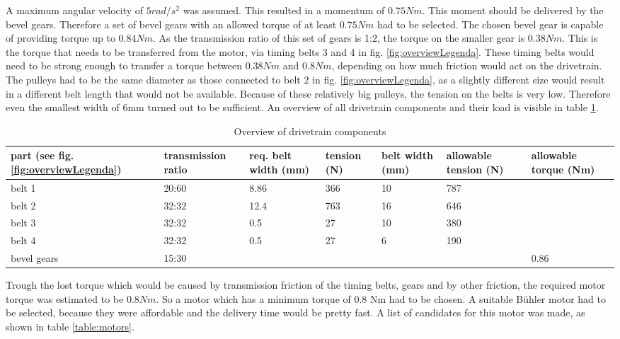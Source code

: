 \documentclass[technical_document.tex]{subfiles}
\begin{document}
A maximum angular velocity of $5 rad/s^2$ was assumed. This resulted in a momentum of $0.75Nm$. This moment should be delivered by the bevel gears. Therefore a set of bevel gears with an allowed torque of at least $0.75Nm$ had to be selected. The chosen bevel gear is capable of providing torque up to $0.84Nm$. As the transmission ratio of this set of gears is 1:2, the torque on the smaller gear is $0.38Nm$. This is the torque that needs to be transferred from the motor, via timing belts 3 and 4 in fig. \ref{fig:overviewLegenda}. These timing belts would need to be strong enough to transfer a torque between $0.38Nm$ and $0.8Nm$, depending on how much friction would act on the drivetrain. The pulleys had to be the same diameter as those connected to belt 2 in fig. \ref{fig:overviewLegenda}, as a slightly different size would result in a different belt length that would not be available. Because of these relatively big pulleys, the tension on the belts is very low. Therefore even the smallest width of 6mm turned out to be sufficient. An overview of all drivetrain components and their load is visible in table \ref{table:belts}.


\begin{table}[h]
\begin{tabular}{| p{1.7cm} | p{1.8cm} | p{1.7cm} | p{1.8cm} | p{1.7cm} | p{1.7cm} | p{1.7cm} |}
\hline
part (see fig. \ref{fig:overviewLegenda})	&	transmission ratio	&	req. belt width (mm)	&	tension (N)	&	belt width (mm)	&	allowable tension (N)	&	allowable torque (Nm)	\\
\hline
belt 1		&	20:60	&	8.86	&	366	&	10	&	787	&			\\
belt 2		&	32:32	&	12.4	&	763	&	16	&	646	&			\\
belt 3		&	32:32	&	0.5		&	27	&	10	&	380	&			\\
belt 4		&	32:32	&	0.5		&	27	&	6	&	190	&			\\
bevel gears	&	15:30	&			&		&		&		&	0.86	\\
\hline
\end{tabular}
\caption{Overview of drivetrain components}
\label{table:belts}
\end{table}


Trough the lost torque which would be caused by transmission friction of the timing belts, gears and by other friction, the required motor torque was estimated to be $0.8Nm$. So a motor which has a minimum torque of 0.8 Nm had to be chosen. A suitable B\"{u}hler motor had to be selected, because they were affordable and the delivery time would be pretty fast. 
A list of candidates for this motor was made, as shown in table \ref{table:motors}.
\end{document}
